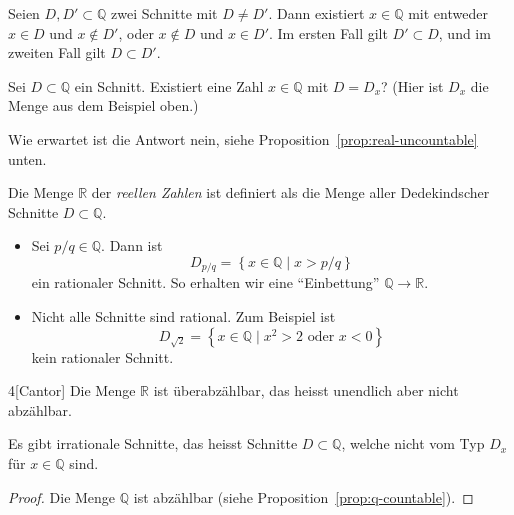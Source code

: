 \documentclass[../main.tex]{subfiles}
\begin{document}
\begin{remark}
  Seien $D, D' \subset \mathbb Q$ zwei Schnitte mit $D \neq D'$.
  Dann existiert $x \in \mathbb Q$ mit entweder $x \in D$ und $x \notin D'$,
  oder $x \notin D$ und $x \in D'$.
  Im ersten Fall gilt $D' \subset D$, und im zweiten Fall gilt $D \subset D'$.
\end{remark}

\begin{question}
  Sei $D \subset \mathbb Q$ ein Schnitt. Existiert
  eine Zahl $x \in \mathbb Q$ mit $D = D_{x}$?
  (Hier ist $D_{x}$ die Menge aus dem Beispiel oben.)
\end{question}

Wie erwartet ist die Antwort nein, siehe Proposition~\ref{prop:real-uncountable} unten.

\begin{definition}
  Die Menge $\mathbb R$ der \textit{reellen Zahlen} ist definiert als die Menge
  aller Dedekindscher Schnitte $D \subset \mathbb Q$.
\end{definition}

\begin{examples}
  \leavevmode
  \begin{itemize}
    \item Sei $p/q \in \mathbb Q$. Dann ist
      \[ D_{p/q} = \left\{x \in \mathbb Q \mid x> p/q \right\}\]
      ein rationaler Schnitt. So erhalten wir eine ``Einbettung''
      $\mathbb Q \to \mathbb R$.
    \item Nicht alle Schnitte sind rational. Zum Beispiel ist
      \[D_{\sqrt 2} = \left\{x \in \mathbb Q \mid x^{2} > 2 \text{ oder } x < 0\right\}\]
      kein rationaler Schnitt.
  \end{itemize}
\end{examples}

\begin{manualproposition}{4}[Cantor]\label{prop:real-uncountable}
  Die Menge $\mathbb R$ ist überabzählbar, das heisst unendlich
  aber nicht abzählbar.
\end{manualproposition}

\begin{corollary}
  Es gibt irrationale Schnitte, das heisst Schnitte $D \subset \mathbb Q$,
  welche nicht vom Typ $D_{x}$ für $x \in \mathbb Q$ sind.
\end{corollary}

\begin{proof}
  Die Menge $\mathbb Q$ ist abzählbar (siehe Proposition~\ref{prop:q-countable}).
\end{proof}
\end{document}
